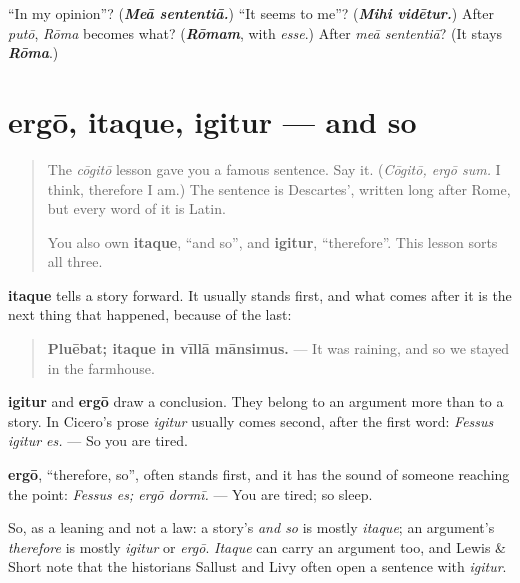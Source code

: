 \begin{tcolorbox}[breakable,colback=teal!4,colframe=teal!35!black,title={Before you move on}]
\textquotedblleft{}In my opinion\textquotedblright{}? (\emph{\textbf{Meā sententiā.}}) \textquotedblleft{}It seems to me\textquotedblright{}? (\emph{\textbf{Mihi vidētur.}}) After \emph{putō}, \emph{Rōma} becomes what? (\emph{\textbf{Rōmam}}, with \emph{esse}.) After \emph{meā sententiā}? (It stays \emph{\textbf{Rōma}}.)
\end{tcolorbox}
\section[ergō, itaque, igitur]{ergō, itaque, igitur — and so}

\label{lesson:LA-C283-ergo}



\begin{quote}
The \emph{cōgitō} lesson gave you a famous sentence. Say it. (\emph{Cōgitō, ergō sum.} I think, therefore I am.) The sentence is Descartes', written long after Rome, but every word of it is Latin.

You also own \textbf{itaque}, \textquotedblleft{}and so\textquotedblright{}, and \textbf{igitur}, \textquotedblleft{}therefore\textquotedblright{}. This lesson sorts all three.
\end{quote}

\begin{grammarlens}[title={Grammar Lens: what happened next, and what follows}]
\textbf{itaque} tells a story forward. It usually stands first, and what comes after it is the next thing that happened, because of the last:

\begin{quote}
\textbf{Pluēbat; itaque in vīllā mānsimus.} — It was raining, and so we stayed in the farmhouse.
\end{quote}

\textbf{igitur} and \textbf{ergō} draw a conclusion. They belong to an argument more than to a story. In Cicero's prose \emph{igitur} usually comes second, after the first word: \emph{Fessus igitur es.} — So you are tired.

\textbf{ergō}, \textquotedblleft{}therefore, so\textquotedblright{}, often stands first, and it has the sound of someone reaching the point: \emph{Fessus es; ergō dormī.} — You are tired; so sleep.

So, as a leaning and not a law: a story's \emph{and so} is mostly \emph{itaque}; an argument's \emph{therefore} is mostly \emph{igitur} or \emph{ergō}. \emph{Itaque} can carry an argument too, and Lewis \& Short note that the historians Sallust and Livy often open a sentence with \emph{igitur}.
\end{grammarlens}

